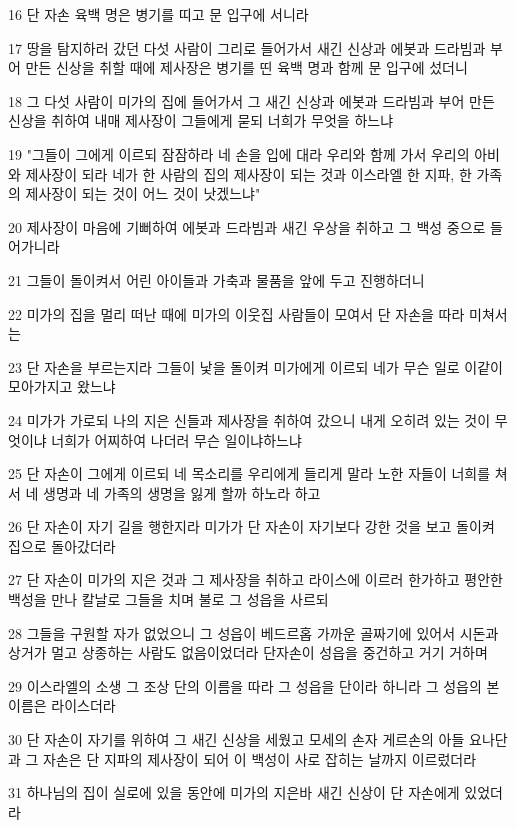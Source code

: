 \par 16 단 자손 육백 명은 병기를 띠고 문 입구에 서니라
\par 17 땅을 탐지하러 갔던 다섯 사람이 그리로 들어가서 새긴 신상과 에봇과 드라빔과 부어 만든 신상을 취할 때에 제사장은 병기를 띤 육백 명과 함께 문 입구에 섰더니
\par 18 그 다섯 사람이 미가의 집에 들어가서 그 새긴 신상과 에봇과 드라빔과 부어 만든 신상을 취하여 내매 제사장이 그들에게 묻되 너희가 무엇을 하느냐
\par 19 "그들이 그에게 이르되 잠잠하라 네 손을 입에 대라 우리와 함께 가서 우리의 아비와 제사장이 되라 네가 한 사람의 집의 제사장이 되는 것과 이스라엘 한 지파, 한 가족의 제사장이 되는 것이 어느 것이 낫겠느냐"
\par 20 제사장이 마음에 기뻐하여 에봇과 드라빔과 새긴 우상을 취하고 그 백성 중으로 들어가니라
\par 21 그들이 돌이켜서 어린 아이들과 가축과 물품을 앞에 두고 진행하더니
\par 22 미가의 집을 멀리 떠난 때에 미가의 이웃집 사람들이 모여서 단 자손을 따라 미쳐서는
\par 23 단 자손을 부르는지라 그들이 낯을 돌이켜 미가에게 이르되 네가 무슨 일로 이같이 모아가지고 왔느냐
\par 24 미가가 가로되 나의 지은 신들과 제사장을 취하여 갔으니 내게 오히려 있는 것이 무엇이냐 너희가 어찌하여 나더러 무슨 일이냐하느냐
\par 25 단 자손이 그에게 이르되 네 목소리를 우리에게 들리게 말라 노한 자들이 너희를 쳐서 네 생명과 네 가족의 생명을 잃게 할까 하노라 하고
\par 26 단 자손이 자기 길을 행한지라 미가가 단 자손이 자기보다 강한 것을 보고 돌이켜 집으로 돌아갔더라
\par 27 단 자손이 미가의 지은 것과 그 제사장을 취하고 라이스에 이르러 한가하고 평안한 백성을 만나 칼날로 그들을 치며 불로 그 성읍을 사르되
\par 28 그들을 구원할 자가 없었으니 그 성읍이 베드르홉 가까운 골짜기에 있어서 시돈과 상거가 멀고 상종하는 사람도 없음이었더라 단자손이 성읍을 중건하고 거기 거하며
\par 29 이스라엘의 소생 그 조상 단의 이름을 따라 그 성읍을 단이라 하니라 그 성읍의 본 이름은 라이스더라
\par 30 단 자손이 자기를 위하여 그 새긴 신상을 세웠고 모세의 손자 게르손의 아들 요나단과 그 자손은 단 지파의 제사장이 되어 이 백성이 사로 잡히는 날까지 이르렀더라
\par 31 하나님의 집이 실로에 있을 동안에 미가의 지은바 새긴 신상이 단 자손에게 있었더라

